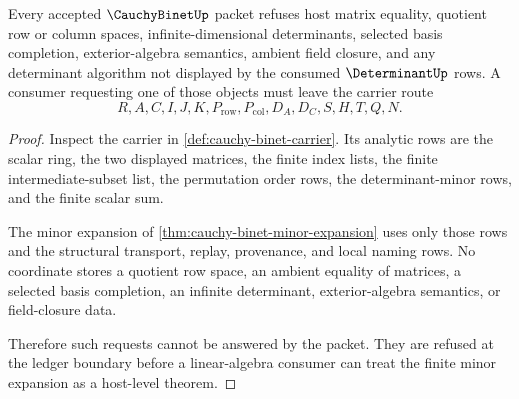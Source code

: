 \begin{theorem}\label{thm:cauchy-binet-ledger-refusal}
Every accepted $\CauchyBinetUp$ packet refuses host matrix equality, quotient row or column spaces, infinite-dimensional determinants, selected basis completion, exterior-algebra semantics, ambient field closure, and any determinant algorithm not displayed by the consumed $\DeterminantUp$ rows. A consumer requesting one of those objects must leave the carrier route
$$
R,A,C,I,J,K,P_{\mathrm{row}},P_{\mathrm{col}},D_A,D_C,S,H,T,Q,N .
$$
\end{theorem}
\begin{proof}
Inspect the carrier in \autoref{def:cauchy-binet-carrier}. Its analytic rows are the scalar ring, the two displayed matrices, the finite index lists, the finite intermediate-subset list, the permutation order rows, the determinant-minor rows, and the finite scalar sum.

The minor expansion of \autoref{thm:cauchy-binet-minor-expansion} uses only those rows and the structural transport, replay, provenance, and local naming rows. No coordinate stores a quotient row space, an ambient equality of matrices, a selected basis completion, an infinite determinant, exterior-algebra semantics, or field-closure data.

Therefore such requests cannot be answered by the packet. They are refused at the ledger boundary before a linear-algebra consumer can treat the finite minor expansion as a host-level theorem.
\end{proof}




